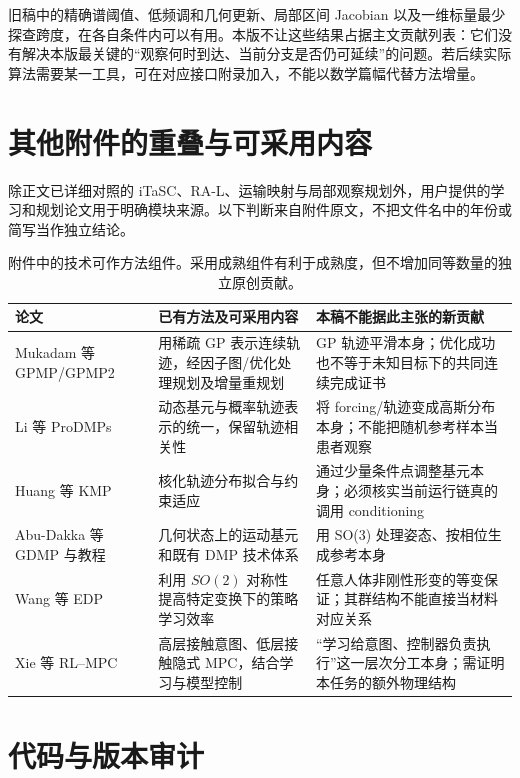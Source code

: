 \documentclass[11pt,a4paper]{article}
\theoremstyle{cn}
\begin{document}
旧稿中的精确谱阈值、低频调和几何更新、局部区间 Jacobian 以及一维标量最少探查跨度，在各自条件内可以有用。本版不让这些结果占据主文贡献列表：它们没有解决本版最关键的“观察何时到达、当前分支是否仍可延续”的问题。若后续实际算法需要某一工具，可在对应接口附录加入，不能以数学篇幅代替方法增量。


\section{其他附件的重叠与可采用内容}

除正文已详细对照的 iTaSC、RA-L、运输映射与局部观察规划外，用户提供的学习和规划论文用于明确模块来源。以下判断来自附件原文，不把文件名中的年份或简写当作独立结论。

\begin{table}[htbp]
\centering\small
\begin{tabularx}{\linewidth}{@{}p{.24\linewidth}XX@{}}
\toprule
论文 & 已有方法及可采用内容 & 本稿不能据此主张的新贡献\\
\midrule
Mukadam 等 GPMP/GPMP2~\cite{gpmp} & 用稀疏 GP 表示连续轨迹，经因子图/优化处理规划及增量重规划 & GP 轨迹平滑本身；优化成功也不等于未知目标下的共同连续完成证书\\
Li 等 ProDMPs~\cite{prodmp} & 动态基元与概率轨迹表示的统一，保留轨迹相关性 & 将 forcing/轨迹变成高斯分布本身；不能把随机参考样本当患者观察\\
Huang 等 KMP~\cite{kmp} & 核化轨迹分布拟合与约束适应 & 通过少量条件点调整基元本身；必须核实当前运行链真的调用 conditioning\\
Abu-Dakka 等 GDMP 与教程~\cite{gdmp,tutorial} & 几何状态上的运动基元和既有 DMP 技术体系 & 用 SO(3) 处理姿态、按相位生成参考本身\\
Wang 等 EDP~\cite{edp} & 利用 \(SO(2)\) 对称性提高特定变换下的策略学习效率 & 任意人体非刚性形变的等变保证；其群结构不能直接当材料对应关系\\
Xie 等 RL--MPC~\cite{rlmpc} & 高层接触意图、低层接触隐式 MPC，结合学习与模型控制 & “学习给意图、控制器负责执行”这一层次分工本身；需证明本任务的额外物理结构\\
\bottomrule
\end{tabularx}
\caption{附件中的技术可作方法组件。采用成熟组件有利于成熟度，但不增加同等数量的独立原创贡献。}
\end{table}

\section{代码与版本审计}
\label{app:code}
\end{document}
